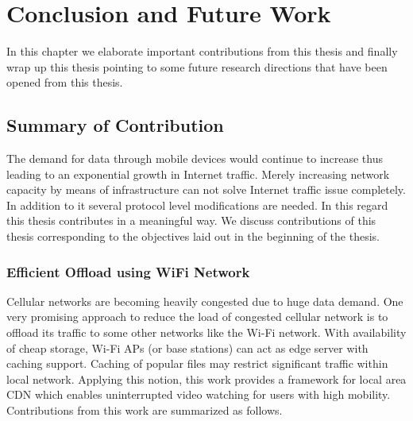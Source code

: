 \chapter[Conclusion and Future Work]{Conclusion and Future Work} In this chapter we elaborate important contributions from this thesis and finally wrap up this thesis pointing to some future research directions that have been opened from this thesis.

\section{Summary of Contribution} The demand for data through mobile devices would continue to increase thus leading to an exponential growth in Internet traffic. Merely increasing network capacity by means of infrastructure can not solve Internet traffic issue completely. In addition to it several protocol level modifications are needed. In this regard this thesis contributes in a meaningful way. We discuss contributions of this thesis corresponding to the objectives laid out in the beginning of the thesis.

\subsection{Efficient Offload using WiFi Network} Cellular networks are becoming heavily congested due to huge data demand. One very promising approach to reduce the load of congested cellular network is to offload its traffic to some other networks like the Wi-Fi network. With availability of cheap storage, Wi-Fi APs (or base stations) can act as edge server with caching support. Caching of popular files may restrict significant traffic within local network. Applying this notion, this work provides a framework for local area CDN which enables uninterrupted video watching for users with high mobility. Contributions from this work are summarized as follows. 

